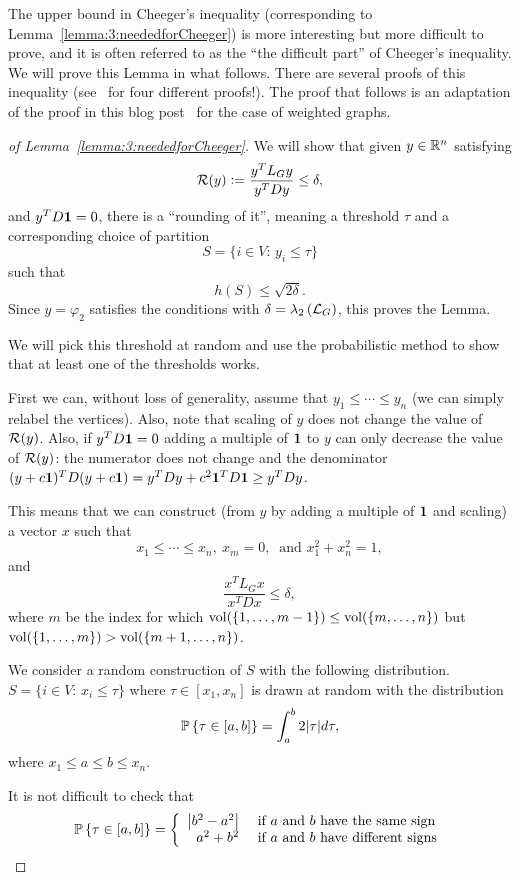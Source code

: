 The upper bound in Cheeger's inequality (corresponding to Lemma~\ref{lemma:3:neededforCheeger}) is more interesting but more difficult to prove, and it is often referred to as the ``the difficult part'' of Cheeger's inequality. We will prove this Lemma in what follows. There are several proofs of this inequality (see~\cite{Chung_CheegersIneq} for four different proofs!). The proof that follows is an adaptation of the proof in this blog post~\cite{trevisan:blog:cheegerproof} for the case of weighted graphs.

\bigskip

\begin{proof}[of Lemma~\ref{lemma:3:neededforCheeger}]

We will show that given $y\in\mathbb{R}^n$ satisfying
\[
\mathcal{R}(y) \mathrel{\mathop:}= \frac{y^TL_Gy}{y^TDy} \leq \delta,
\]
and $y^TD\mathbf{1} = 0$, there is a ``rounding of it'', meaning a threshold $\tau$ and a corresponding choice of partition
\[
S = \{  i\in V:\, y_i \leq \tau \}
\]
such that
\[
h(S) \leq \sqrt{2\delta}.
\]
Since $y=\varphi_2$ satisfies the conditions with $\delta = \lambda_2\left(\mathcal{L}_G \right)$, this proves the Lemma.

We will pick this threshold at random and use the probabilistic method to show that at least one of the thresholds works.

First we can, without loss of generality, assume that $y_1\leq \cdots \leq y_n$ (we can simply relabel the vertices). Also, note that scaling of $y$ does not change the value of $\mathcal{R}(y)$. Also, if $y^TD\mathbf{1}=0$ adding a multiple of $\mathbf{1}$ to $y$ can only decrease the value of $\mathcal{R}(y)$: the numerator does not change and the denominator $(y+c\mathbf{1})^TD(y+c\mathbf{1}) = y^TDy + c^2 \mathbf{1}^TD\mathbf{1} \geq y^TDy$.

This means that we can construct (from $y$ by adding a multiple of $\mathbf{1}$ and scaling) a vector $x$ such that
\[
x_1\leq \cdots \leq x_n, \
x_m=0, \ \text{ and } x_1^2 + x_n^2 = 1,
\]
and
\[
\frac{x^TL_Gx}{x^TDx} \leq \delta,
\]
where $m$ be the index for which $\operatorname{vol}(\{1,\dots,m-1\}) \leq \operatorname{vol}(\{m,\dots,n\})$ but $\operatorname{vol}(\{1,\dots,m\}) > \operatorname{vol}(\{m+1,\dots,n\})$.


We consider a random construction of $S$ with the following distribution. $S = \{  i\in V:\, x_i \leq \tau \}$ where $\tau \in [x_1,x_n]$ is drawn at random with the distribution
\[
{\mathbb{P}}\left\{  \tau \in [a,b]   \right\} = \int_{a}^{b} 2|\tau | d\tau,
\]
where $x_1 \leq a\leq b \leq x_n$.

It is not difficult to check that
\[
{\mathbb{P}}\left\{  \tau \in [a,b]   \right\} = \left\{   \begin{array}{rl}     \left|  b^2-a^2 \right|   & \text{ if } a \text{ and } b \text{ have the same sign} \\
       a^2+b^2  & \text{ if } a \text{ and } b \text{ have different signs}    \end{array}  \right.
\]




\end{proof}

